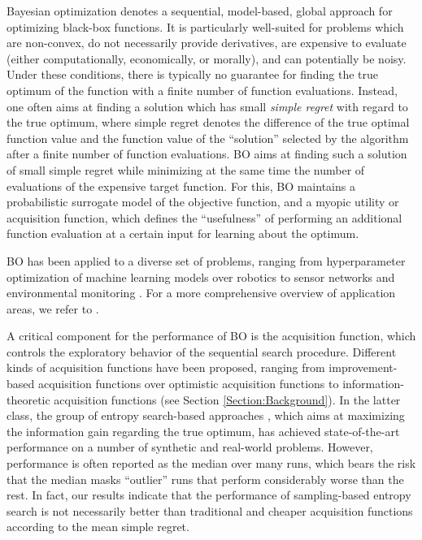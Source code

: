 \documentclass[10pt,letterpaper]{article} %
\begin{document}
Bayesian optimization \citep[BO,][]{shahriari_taking_2016} denotes a sequential,
model-based, global approach for optimizing black-box functions. It is particularly well-suited for problems
which are non-convex, do not necessarily provide derivatives, are expensive to evaluate (either
computationally, economically, or morally), and can potentially be noisy. Under
these conditions, there is typically no guarantee for finding the true optimum of the
function with a finite number of function evaluations. Instead, one often aims
at finding a solution which has small \emph{simple regret} \cite{bubeck_pure_2009} with regard to the true optimum, where 
simple regret denotes the difference of the true optimal function value 
and the function value of the ``solution'' selected by the algorithm after a finite number of function evaluations. BO
aims at finding such a solution of small simple regret while  minimizing at the same
time the number of evaluations of the expensive target function. For this, BO
maintains a probabilistic surrogate model of the objective function, and a
myopic utility or acquisition function, which defines the ``usefulness'' of
performing an additional function evaluation at a certain input for learning about the optimum.

BO has been applied to a diverse set of problems, ranging from hyperparameter optimization
of machine learning models \cite{bergstra_algorithms_2011,snoek_practical_2012} over robotics
\cite{calandra_bayesian_2015,lizotte_automatic_2007,kroemer_combining_2010,alonso_an_2015} to
sensor networks \cite{srinivas_gaussian_2010} and environmental monitoring
\cite{6385653}. For a more comprehensive overview of application areas, we refer
to \citet{shahriari_taking_2016}.

A critical component for the performance of BO is the acquisition function,
which controls the exploratory behavior of the sequential search procedure.
Different kinds of acquisition functions have been proposed, ranging from
improvement-based acquisition functions over optimistic acquisition functions to
information- theoretic acquisition functions (see Section
\ref{Section:Background}). In the latter class, the group of entropy
search-based approaches
\cite{villemonteix_informational_2008, hennig_entropy_2012,hernandez-lobato_predictive_2014}, 
which aims at maximizing the information gain regarding
the true optimum, has achieved state-of-the-art performance on a number of
synthetic and real-world problems. However, performance is often reported as the
median over many runs, which bears the risk that the median masks ``outlier'' runs that
perform considerably worse than the rest. In fact, our results indicate that
the performance of sampling-based entropy search is not necessarily better
than traditional and cheaper acquisition functions according to the mean simple regret.
\end{document}
